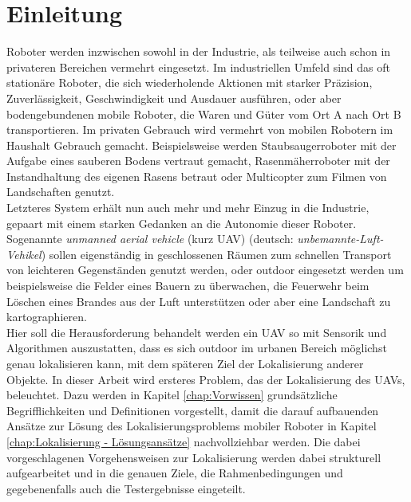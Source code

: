 \clearpage
\chapter{\textbf{Einleitung}}\label{chap:Einleitung}

Roboter werden inzwischen sowohl in der Industrie, als teilweise auch schon in privateren Bereichen vermehrt eingesetzt. Im industriellen Umfeld sind das oft stationäre Roboter, die sich wiederholende Aktionen mit starker Präzision, Zuverlässigkeit, Geschwindigkeit und Ausdauer ausführen, oder aber bodengebundenen mobile Roboter, die Waren und Güter vom Ort A nach Ort B transportieren. Im privaten Gebrauch wird vermehrt von mobilen Robotern im Haushalt Gebrauch gemacht. Beispielsweise werden Staubsaugerroboter mit der Aufgabe eines sauberen Bodens vertraut gemacht, Rasenmäherroboter mit der Instandhaltung des eigenen Rasens betraut oder Multicopter zum Filmen von Landschaften genutzt.\\
Letzteres System erhält nun auch mehr und mehr Einzug in die Industrie, gepaart mit einem starken Gedanken an die Autonomie dieser Roboter. Sogenannte \textit{unmanned aerial vehicle} (kurz UAV) (deutsch: \textit{unbemannte-Luft-Vehikel}) sollen eigenständig in geschlossenen Räumen zum schnellen Transport von leichteren Gegenständen genutzt werden, oder outdoor eingesetzt werden um beispielsweise die Felder eines Bauern zu überwachen, die Feuerwehr beim Löschen eines Brandes aus der Luft unterstützen oder aber eine Landschaft zu kartographieren.\\
Hier soll die Herausforderung behandelt werden ein UAV so mit Sensorik und Algorithmen auszustatten, dass es sich outdoor im urbanen Bereich möglichst genau lokalisieren kann, mit dem späteren Ziel der Lokalisierung anderer Objekte. In dieser Arbeit wird ersteres Problem, das der Lokalisierung des UAVs, beleuchtet. Dazu werden in Kapitel \ref{chap:Vorwissen} grundsätzliche Begrifflichkeiten und Definitionen vorgestellt, damit die darauf aufbauenden Ansätze zur Lösung des Lokalisierungsproblems mobiler Roboter in Kapitel \ref{chap:Lokalisierung - Lösungsansätze} nachvollziehbar werden. Die dabei vorgeschlagenen Vorgehensweisen zur Lokalisierung werden dabei strukturell aufgearbeitet und in die genauen Ziele, die Rahmenbedingungen und gegebenenfalls auch die Testergebnisse eingeteilt. 

